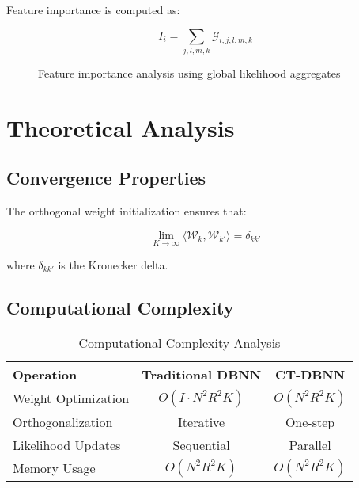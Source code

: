 \documentclass[journal]{IEEEtran}
\begin{document}
Feature importance is computed as:

\begin{equation}
I_i = \sum_{j,l,m,k} \mathcal{G}_{i,j,l,m,k}
\end{equation}

\begin{figure}[!ht]
\centering
{}
\caption{Feature importance analysis using global likelihood aggregates}
\label{fig:feature_importance}
\end{figure}

\section{Theoretical Analysis}

\subsection{Convergence Properties}

The orthogonal weight initialization ensures that:

\begin{equation}
\lim_{K \to \infty} \langle \mathcal{W}_k, \mathcal{W}_{k'} \rangle = \delta_{kk'}
\end{equation}

where $\delta_{kk'}$ is the Kronecker delta.

\subsection{Computational Complexity}

\begin{table}[!ht]
\centering
\caption{Computational Complexity Analysis}
\begin{tabular}{|l|c|c|}
\hline
Operation & Traditional DBNN & CT-DBNN \\
\hline
Weight Optimization & $O(I \cdot N^2 R^2 K)$ & $O(N^2 R^2 K)$ \\
Orthogonalization & Iterative & One-step \\
Likelihood Updates & Sequential & Parallel \\
Memory Usage & $O(N^2 R^2 K)$ & $O(N^2 R^2 K)$ \\
\hline
\end{tabular}
\end{table}
\end{document}

